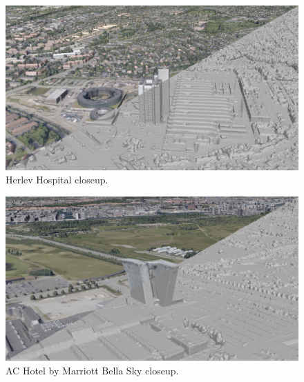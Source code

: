 \documentclass[10pt,letterpaper]{article}
\begin{document}
\begin{figure}
    \centering
    \capstart
    \begin{minipage}[b]{1.0\linewidth}
        \includegraphics[width=\textwidth]{images/copenhagen/results/closeups/diag/herlev_hospital_diag.jpg}
    \end{minipage}
    \caption{Herlev Hospital closeup.}
    \label{fig:closeup_hospital}
\end{figure}

\begin{figure}
    \centering
    \capstart
    \begin{minipage}[b]{1.0\linewidth}
        \includegraphics[width=\textwidth]{images/copenhagen/results/closeups/diag/hotel_marriott_bella_sky_diag.jpg}
    \end{minipage}
    \caption{AC Hotel by Marriott Bella Sky closeup.}
    \label{fig:closeup_hotel}
\end{figure}
\end{document}
